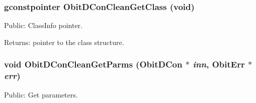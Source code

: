 \subsubsection{\setlength{\rightskip}{0pt plus 5cm}gconstpointer Obit\-DCon\-Clean\-Get\-Class (void)}\label{ObitDConClean_8c_a13}


Public: Class\-Info pointer. 

\begin{Desc}
\item[Returns:]pointer to the class structure. \end{Desc}
\subsubsection{\setlength{\rightskip}{0pt plus 5cm}void Obit\-DCon\-Clean\-Get\-Parms ({\bf Obit\-DCon} $\ast$ {\em inn}, {\bf Obit\-Err} $\ast$ {\em err})}\label{ObitDConClean_8c_a18}


Public: Get parameters. 


